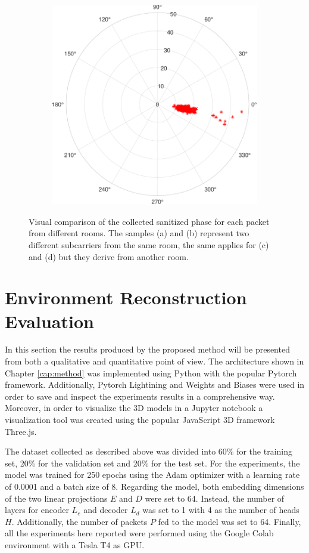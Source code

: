 \documentclass[binding=0.6cm,noexaminfo]{sapthesis}
\begin{document}
\begin{figure}[h!]
\begin{subfigure}{.49\textwidth}
	\caption{}
\end{subfigure}
\begin{subfigure}{.49\textwidth}
	\centering
	\includegraphics[width=.7\linewidth]{room2-v7-6-sanitized_phase subcarrier_21}
	\caption{}
\end{subfigure}
\caption{Visual comparison of the collected sanitized phase for each packet from different rooms. The samples (a) and (b) represent two different subcarriers from the same room, the same applies for (c) and (d) but they derive from another room.}
\label{fig:phase-comp}
\end{figure}

\section{Environment Reconstruction Evaluation}\label{sec:eval}

In this section the results produced by the proposed method will be presented from both a qualitative and quantitative point of view.
The architecture shown in Chapter \ref{cap:method} was implemented using Python with the popular Pytorch framework. Additionally, Pytorch Lightining and Weights and Biases were used in order to save and inspect the experiments results in a comprehensive way. Moreover, in order to visualize the 3D models in a Jupyter notebook a visualization tool was created using the popular JavaScript 3D framework Three.js.

The dataset collected as described above was divided into 60\% for the training set, 20\% for the validation set and 20\% for the test set. For the experiments, the model was trained for 250 epochs using the Adam optimizer \cite{adam} with a learning rate of 0.0001 and a batch size of 8. Regarding the model, both embedding dimensions of the two linear projections $E$ and $D$ were set to 64. Instead, the number of layers for encoder $L_e$ and decoder $L_d$ was set to 1 with 4 as the number of heads $H$. Additionally, the number of packets $P$ fed to the model was set to 64. Finally, all the experiments here reported were performed using the Google Colab environment with a Tesla T4 as GPU.
\end{document}
